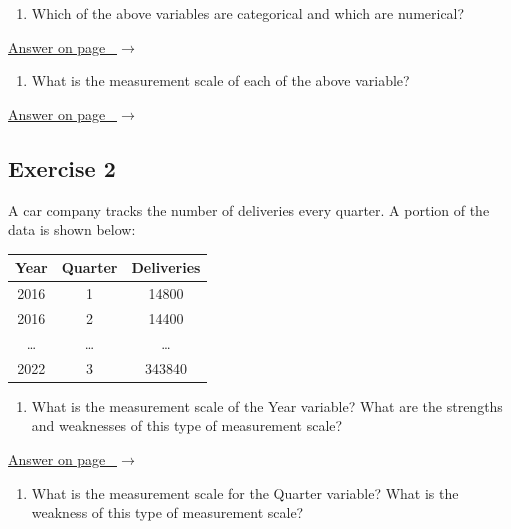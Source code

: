 \documentclass[
  11pt,
  letterpaper,
  DIV=11,
  numbers=noendperiod,
  oneside,
  open=any]{scrreprt}
\providecommand{\tightlist}{%
  \setlength{\itemsep}{0pt}\setlength{\parskip}{0pt}}\usepackage{longtable,booktabs,array}
\newcommand{\bsanswerref}[1]{%
  \par\nopagebreak\hypertarget{q-#1}{}\label{q-#1}%
  {\raggedleft\sffamily\footnotesize\hyperlink{a-#1}{\textcolor{bsaccent}{Answer on page \pageref{a-#1}\ $\rightarrow$}}\par}%
  \medskip}
\begin{document}
\begin{enumerate}
\def\labelenumi{\arabic{enumi}.}
\tightlist
\item
  Which of the above variables are categorical and which are numerical?
\end{enumerate}

\bsanswerref{bsans1}

\begin{enumerate}
\def\labelenumi{\arabic{enumi}.}
\setcounter{enumi}{1}
\tightlist
\item
  What is the measurement scale of each of the above variable?
\end{enumerate}

\bsanswerref{bsans2}

\subsection*{Exercise 2}\label{exercise-2}

A car company tracks the number of deliveries every quarter. A portion
of the data is shown below:

\begin{center}
\begin{tabular}{ccc}
\toprule
Year & Quarter & Deliveries \\
\midrule
2016 & 1 & 14800 \\
2016 & 2 & 14400 \\
\ldots{} & \ldots{} & \ldots{} \\
2022 & 3 & 343840 \\
\bottomrule
\end{tabular}
\end{center}

\begin{enumerate}
\def\labelenumi{\arabic{enumi}.}
\tightlist
\item
  What is the measurement scale of the Year variable? What are the
  strengths and weaknesses of this type of measurement scale?
\end{enumerate}

\bsanswerref{bsans3}

\begin{enumerate}
\def\labelenumi{\arabic{enumi}.}
\setcounter{enumi}{1}
\tightlist
\item
  What is the measurement scale for the Quarter variable? What is the
  weakness of this type of measurement scale?
\end{enumerate}
\end{document}
